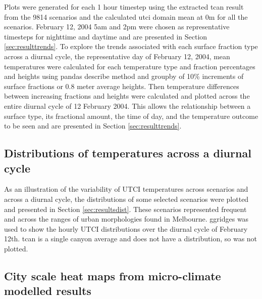 \documentclass[final,3p,times,authoryear]{elsarticle}
\begin{document}
Plots were generated for each 1 hour timestep using the extracted \gls{tcan} result from the 9814 scenarios and the calculated \gls{utci} domain mean at 0m for all the scenarios. February 12, 2004 5am and 2pm were chosen as representative timesteps for nighttime and daytime and are presented in Section \ref{sec:resulttrends}. To explore the trends associated with each surface fraction type across a diurnal cycle, the representative day of February 12, 2004, mean temperatures were calculated for each temperature type and fraction percentages and heights using pandas \citep{reback2020pandas} describe method and groupby of 10\% increments of surface fractions or 0.8 meter average heights. Then temperature differences between increasing fractions and heights were calculated and plotted across the entire diurnal cycle of 12 February 2004. This allows the relationship between a surface type, its fractional amount, the time of day, and the temperature outcome to be seen and are presented in Section \ref{sec:resulttrends}.



\subsection{Distributions of temperatures across a diurnal cycle}\label{sec:methodsdist}
%
% 

As an illustration of the variability of UTCI temperatures across scenarios and across a diurnal cycle, the distributions of some selected scenarios were plotted and presented in Section \ref{sec:resultsdist}. These scenarios represented frequent and across the ranges of urban morphologies found in Melbourne. ggridges \citep{ggridges} was used to show the hourly UTCI distributions over the diurnal cycle of February 12th. \gls{tcan} is a single canyon average and does not have a distribution, so was not plotted. 

\subsection{City scale heat maps from micro-climate modelled results}\label{sec:methodsheatmaps}
\end{document}
